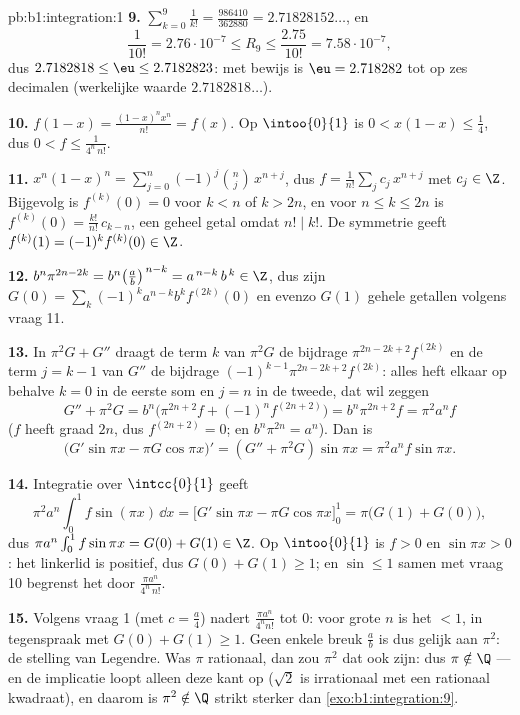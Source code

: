 \begin{solution}{pb:b1:integration:1}
\textbf{9.} $\sum_{k=0}^{9} \frac{1}{k!} = \frac{986410}{362880}
= 2.71828152\dots$, en
\[
\frac{1}{10!} = 2.76\cdot10^{-7} \leq R_9 \leq
\frac{2.75}{10!} = 7.58\cdot10^{-7} ,
\]
dus $2.7182818 \leq \eu \leq 2.7182823$: met bewijs is $\eu =
2.718282$ tot op zes decimalen (werkelijke waarde
$2.7182818\dots$).

\textbf{10.} $f(1 - x) = \frac{(1-x)^n x^n}{n!} = f(x)$. Op
$\intoo{0}{1}$ is $0 < x(1-x) \leq \frac14$, dus $0 < f \leq
\frac{1}{4^n\,n!}$.

\textbf{11.} $x^n(1-x)^n = \sum_{j=0}^{n} (-1)^j\binom
nj\,x^{n+j}$, dus $f = \frac{1}{n!}\sum_j c_j\,x^{n+j}$ met $c_j
\in \Z$. Bijgevolg is $f^{(k)}(0) = 0$ voor $k < n$ of $k > 2n$,
en voor $n \leq k \leq 2n$ is $f^{(k)}(0) = \frac{k!}{n!}\,
c_{k-n}$, een geheel getal omdat $n! \mid k!$. De symmetrie geeft
$f^{(k)}(1) = (-1)^k f^{(k)}(0) \in \Z$.

\textbf{12.} $b^n \pi^{2n-2k} = b^n\bigl(\frac
ab\bigr)^{\,n-k} = a^{\,n-k}\,b^{\,k} \in \Z$, dus zijn $G(0) =
\sum_k (-1)^k a^{n-k} b^k f^{(2k)}(0)$ en evenzo $G(1)$ gehele
getallen volgens vraag 11.

\textbf{13.} In $\pi^2 G + G''$ draagt de term $k$ van $\pi^2 G$
de bijdrage $\pi^{2n-2k+2}f^{(2k)}$ en de term $j = k - 1$ van
$G''$ de bijdrage $(-1)^{k-1}\pi^{2n-2k+2}f^{(2k)}$: alles heft
elkaar op behalve $k = 0$ in de eerste som en $j = n$ in de
tweede, dat wil zeggen
\[
G'' + \pi^2 G = b^n\bigl(\pi^{2n+2} f + (-1)^n f^{(2n+2)}\bigr)
= b^n \pi^{2n+2} f = \pi^2 a^n f
\]
($f$ heeft graad $2n$, dus $f^{(2n+2)} = 0$; en $b^n\pi^{2n} =
a^n$). Dan is
\[
\bigl(G'\sin\pi x - \pi G\cos\pi x\bigr)'
= (G'' + \pi^2 G)\sin \pi x = \pi^2 a^n f\sin\pi x .
\]

\textbf{14.} Integratie over $\intcc{0}{1}$ geeft
\[
\pi^2 a^n \int_0^1 f\sin(\pi x)\,\dd x
= \bigl[G'\sin\pi x - \pi G\cos\pi x\bigr]_0^1
= \pi\bigl(G(1) + G(0)\bigr) ,
\]
dus $\pi a^n \int_0^1 f\sin\pi x = G(0) + G(1) \in \Z$. Op
$\intoo{0}{1}$ is $f > 0$ en $\sin\pi x > 0$: het linkerlid is
positief, dus $G(0) + G(1) \geq 1$; en $\sin \leq 1$ samen met
vraag 10 begrenst het door $\frac{\pi a^n}{4^n\,n!}$.

\textbf{15.} Volgens vraag 1 (met $c = \frac a4$) nadert
$\frac{\pi a^n}{4^n n!}$ tot $0$: voor grote $n$ is het $< 1$, in
tegenspraak met $G(0) + G(1) \geq 1$. Geen enkele breuk $\frac
ab$ is dus gelijk aan $\pi^2$: de stelling van Legendre. Was
$\pi$ rationaal, dan zou $\pi^2$ dat ook zijn: dus $\pi \notin
\Q$ --- en de implicatie loopt alleen deze kant op ($\sqrt2$ is
irrationaal met een rationaal kwadraat), en daarom is $\pi^2
\notin \Q$ strikt sterker dan \cref{exo:b1:integration:9}.


\end{solution}
